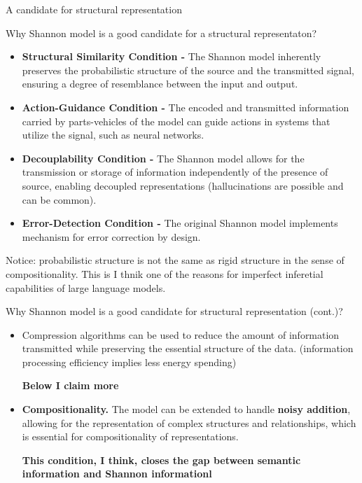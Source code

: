 \documentclass[10pt, aspectratio=169]{beamer}
\begin{document}
\begin{frame}
    \begin{center}
      \Huge A candidate for structural representation
    \end{center}
\end{frame}






\begin{frame}{Why Shannon model is a good candidate for a structural representaton?}
    \begin{itemize}
        \item \textbf{Structural Similarity Condition - } The Shannon model inherently preserves the {\color{red} probabilistic structure} of the source and the transmitted signal, ensuring a degree of resemblance between the input and output.
        \item \textbf{Action-Guidance Condition - } The encoded and transmitted information carried by parts-vehicles of the model can guide actions in systems that  utilize the signal, such as neural networks.
        \item \textbf{Decouplability Condition -} The Shannon model allows for the transmission or storage of information independently of the presence of  source, enabling decoupled representations (hallucinations are possible and can be common). 
        \item \textbf{Error-Detection Condition -} The original Shannon model implements mechanism for error correction by design.
    \end{itemize}

    {\color{red}  Notice: probabilistic structure is not the same as rigid structure in the sense of compositionality. This is I thnik  one of the reasons for imperfect inferetial capabilities of large language models. }
    
\end{frame}




\begin{frame}{Why Shannon model is a good candidate for structural representation (cont.)?}
    \begin{itemize}
        
        \item Compression  algorithms can be used to reduce the amount of information transmitted while preserving the essential structure of the data. (information processing efficiency implies less energy spending)
        
        \bigskip
\textbf{        {\color{red} Below I claim more }
}     
        \item \textbf{Compositionality.} The model can be extended to handle \textbf{noisy addition}, allowing for the representation of complex structures and relationships, which is essential for compositionality of representations.
       
       \textbf{ This condition, I think, closes the gap between semantic information and Shannon informationl}
    \end{itemize}

   
\end{frame}
\end{document}
